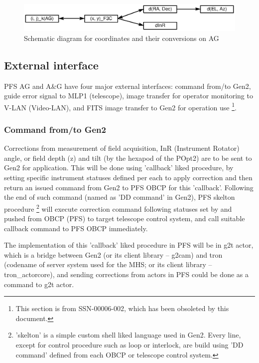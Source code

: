 \documentclass[a4paper,notitlepage]{article}
\begin{document}
\begin{figure}[htb]
  \begin{center}
    \includegraphics{ag_coord_conv.eps}
  \end{center}
  \caption{Schematic diagram for coordinates and their conversions on AG}
  \label{fig:coord_conv}
\end{figure}

\subsection{External interface}

PFS AG and A\&G have four major external interfaces: 
command from/to Gen2, guide error signal to MLP1 (telescope), 
image transfer for operator monitoring to V-LAN (Video-LAN), 
and FITS image transfer to Gen2 for operation use
\footnote{This section is from SSN-00006-002, which has been obsoleted by 
this document.}. 

\subsubsection{Command from/to Gen2}

Corrections from measurement of field acquisition, InR (Instrument Rotator) 
angle, or field depth (z) and tilt (by the hexapod of the POpt2) are to be 
sent to Gen2 for application. 
This will be done using 'callback' liked procedure, by setting specific 
instrument statuses defined per each to apply correction and then return an 
issued command from Gen2 to PFS OBCP for this 'callback'. 
Following the end of such command (named as 'DD command' in Gen2), PFS skelton 
procedure
\footnote{'skelton' is a simple custom shell liked language used in Gen2. 
Every line, except for control procedure such as loop or interlock, are 
build using 'DD command' defined from each OBCP or telescope control system. }
will execute correction command following statuses set by and pushed from 
OBCP (PFS) to target telescope control system, and call suitable callback 
command to PFS OBCP immediately. 

The implementation of this 'callback' liked procedure in PFS will be in g2t 
actor, which is a bridge between Gen2 (or its client library -- g2cam) and 
tron (codename of server system used for the MHS; or its client library -- 
tron\_actorcore), and sending corrections from actors in PFS could be 
done as a command to g2t actor. 
\end{document}
